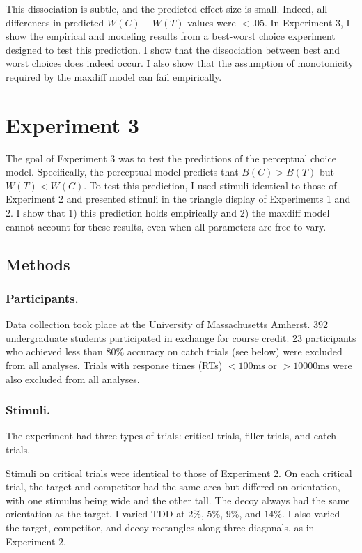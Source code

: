 This dissociation is subtle, and the predicted effect size is small. Indeed, all differences in predicted $W(C)-W(T)$ values were $<.05$. In Experiment 3, I show the empirical and modeling results from a best-worst choice experiment designed to test this prediction. I show that the dissociation between best and worst choices does indeed occur. I also show that the assumption of monotonicity required by the maxdiff model can fail empirically.

\section{Experiment 3}

The goal of Experiment 3 was to test the predictions of the perceptual choice model. Specifically, the perceptual model predicts that $B(C)>B(T)$ but $W(T)<W(C)$. To test this prediction, I used stimuli identical to those of Experiment 2 and presented stimuli in the triangle display of Experiments 1 and 2.
I show that 1) this prediction holds empirically and 2) the maxdiff model cannot account for these results, even when all parameters are free to vary. 

\subsection{Methods}

\subsubsection{Participants.}
Data collection took place at the University of Massachusetts Amherst. 392 undergraduate students participated in exchange for course credit. 23 participants who achieved less than $80\%$ accuracy on catch trials (see below) were excluded from all analyses. Trials with response times (RTs) $<100\text{ms}$ or  $>10000\text{ms}$ were also excluded from all analyses.

\subsubsection{Stimuli.}
The experiment had three types of trials: critical trials, filler trials, and catch trials. 

Stimuli on critical trials were identical to those of Experiment 2. On each critical trial, the target and competitor had the same area but differed on orientation, with one stimulus being wide and the other tall. The decoy always had the same orientation as the target. I varied TDD at $2\%$, $5\%$, $9\%$, and $14\%$. I also varied the target, competitor, and decoy rectangles along three diagonals, as in Experiment 2. 

